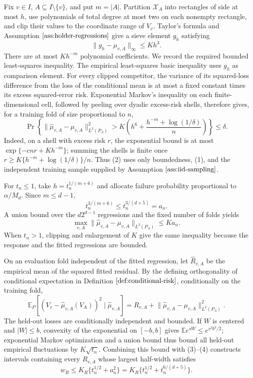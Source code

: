 Fix \(v\in I\), \(A\subseteq I\setminus\{v\}\), and put \(m=|A|\). Partition \(\mathcal X_A\) into rectangles of side at most \(h\), use polynomials of total degree at most two on each nonempty rectangle, and clip their values to the coordinate range of \(V_v\). Taylor's formula and Assumption \(\ref{ass:holder-regressions}\) give a sieve element \(g_h\) satisfying
\[
\lVert g_h-\mu_{v,A}\rVert_\infty\le Kh^3. \tag{1}
\]
There are at most \(Kh^{-m}\) polynomial coefficients. We record the required bounded least-squares inequality. The empirical least-squares basic inequality uses \(g_h\) as comparison element. For every clipped competitor, the variance of its squared-loss difference from the loss of the conditional mean is at most a fixed constant times its excess squared-error risk. Exponential Markov's inequality on each finite-dimensional cell, followed by peeling over dyadic excess-risk shells, therefore gives, for a training fold of size proportional to \(n\),
\[
\Pr\!\left\{
\lVert\widehat\mu_{v,A}-\mu_{v,A}\rVert_{L^2(P_A)}^2
>K\left(h^6+\frac{h^{-m}+\log(1/\delta)}{n}\right)
\right\}\le\delta. \tag{2}
\]
Indeed, on a shell with excess risk \(r\), the exponential bound is at most \(\exp\{-cnr+Kh^{-m}\}\); summing the shells is finite once \(r\ge K\{h^{-m}+\log(1/\delta)\}/n\). Thus (2) uses only boundedness, (1), and the independent training sample supplied by Assumption \(\ref{ass:iid-sampling}\).

For \(t_n\le1\), take \(h=t_n^{1/(m+6)}\) and allocate failure probability proportional to \(\alpha/M_d\). Since \(m\le d-1\),
\[
t_n^{3/(m+6)}\le t_n^{3/(d+5)}=a_n.
\]
A union bound over the \(d2^{d-1}\) regressions and the fixed number of folds yields
\[
\max_{v,A}\lVert\widehat\mu_{v,A}-\mu_{v,A}\rVert_{L^2(P_A)}
\le Ka_n. \tag{3}
\]
When \(t_n>1\), clipping and enlargement of \(K\) give the same inequality because the response and the fitted regressions are bounded.

On an evaluation fold independent of the fitted regression, let \(\widehat R_{v,A}\) be the empirical mean of the squared fitted residual. By the defining orthogonality of conditional expectation in Definition \(\ref{def:conditional-risk}\), conditionally on the training fold,
\[
\mathbb E_P\!\left[(V_v-\widehat\mu_{v,A}(V_A))^2\mid\widehat\mu_{v,A}\right]
=R_{v,A}+\lVert\widehat\mu_{v,A}-\mu_{v,A}\rVert_{L^2(P_A)}^2. \tag{4}
\]
The held-out losses are conditionally independent and bounded. If \(W\) is centered and \(|W|\le b\), convexity of the exponential on \([-b,b]\) gives \(\mathbb E e^{sW}\le e^{s^2b^2/2}\); exponential Markov optimization and a union bound thus bound all held-out empirical fluctuations by \(K\sqrt{t_n}\). Combining this bound with (3)--(4) constructs intervals containing every \(R_{v,A}\) whose largest half-width satisfies
\[
w_R\le K_R\{t_n^{1/2}+a_n^2\}
=K_R\{t_n^{1/2}+t_n^{6/(d+5)}\}. \tag{5}
\]

